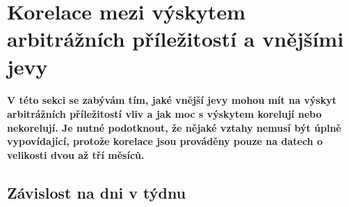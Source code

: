 \documentclass[thesis=B,czech]{FITthesis}[2019/03/21]
\begin{document}
\section{Korelace mezi výskytem arbitrážních příležitostí a vnějšími jevy}
\paragraph{
V této sekci se zabývám tím, jaké vnější jevy mohou mít na výskyt arbitrážních příležitostí vliv a jak moc s výskytem korelují nebo nekorelují. Je nutné podotknout, že nějaké vztahy nemusí být úplně vypovídající, protože korelace jsou prováděny pouze na datech o velikosti dvou až tří měsíců.
}
\subsection{Závislost na dni v týdnu}
\end{document}
